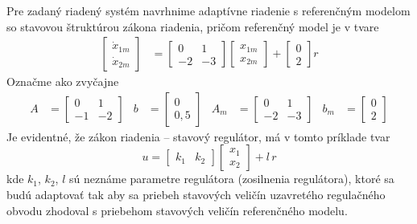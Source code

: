 \documentclass[a4paper, 10pt, ]{article}
\begin{document}
Pre zadaný riadený systém navrhnime adaptívne riadenie s referenčným modelom so stavovou štruktúrou zákona riadenia, pričom referenčný model je v tvare
\begin{subequations}
	\begin{align}
	\begin{bmatrix}
	 		\dot x_{1m}  \\
	 		\dot x_{2m}
	 \end{bmatrix}
	 &=
	 \begin{bmatrix}
	 		0 & 1 \\
	 		-2 & -3
	 \end{bmatrix}
	 \begin{bmatrix}
	 		x_{1m}  \\
	 		x_{2m}
	 \end{bmatrix}
	 +
	 \begin{bmatrix}
	 		0  \\
	 		2
	 \end{bmatrix}
	 r
	 \label{stavovyOpisRM2R_priklad}
	\end{align}
\end{subequations}
Označme ako zvyčajne
	\begin{align*}
	 A
	 &=
	 \begin{bmatrix}
	 		0 & 1 \\
	 		-1 & -2
	 \end{bmatrix}
	 &
	 b
	 &=
	 \begin{bmatrix}
	 		0  \\
	 		0,5
	 \end{bmatrix}
	 &
	 A_m
	 &=
	 \begin{bmatrix}
	 		0 & 1 \\
	 		-2 & -3
	 \end{bmatrix}
	 &
	 b_m
	 &=
	 \begin{bmatrix}
	 		0  \\
	 		2
	 \end{bmatrix}
	\end{align*}
Je evidentné, že zákon riadenia -- stavový regulátor, má v tomto príklade tvar
\begin{equation} \label{stavZakRiad2r_priklad}
	u
	=
	\begin{bmatrix} k_1 & k_2 \end{bmatrix}
	\begin{bmatrix} x_1 \\ x_2 \end{bmatrix}
	+
	l \, r
\end{equation}
kde $k_1$, $k_2$, $l$ sú neznáme parametre regulátora (zosilnenia regulátora), ktoré sa budú adaptovať tak aby sa priebeh stavových veličín uzavretého regulačného obvodu zhodoval s priebehom stavových veličín referenčného modelu.
\end{document}

